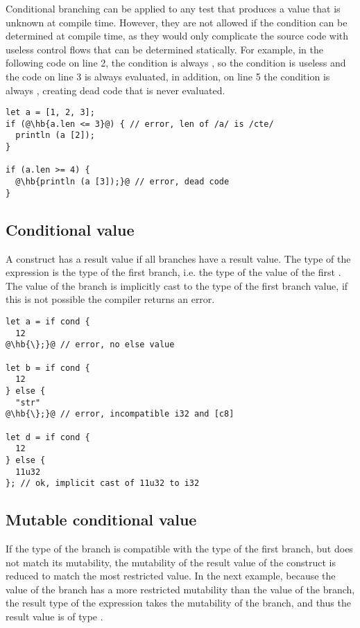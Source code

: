 

Conditional branching can be applied to any test that produces a 
value that is unknown at compile time. However, they are not allowed if the
condition can be determined at compile time, as they would only complicate the
source code with useless control flows that can be determined statically. For
example, in the following code on line 2, the condition is always ,
so the condition is useless and the code on line 3 is always evaluated, in
addition, on line 5 the condition is always , creating dead code
that is never evaluated.

\begin{lstlisting}[style=coloredverbatim, escapechar=@]
let a = [1, 2, 3];
if (@\hb{a.len <= 3}@) { // error, len of /a/ is /cte/
  println (a [2]);
}

if (a.len >= 4) {
  @\hb{println (a [3]);}@ // error, dead code
}
\end{lstlisting}

\subsection {Conditional value}
\label{sec:cond_value_type}

A  construct has a result value if all branches have a result value.
The type of the expression is the type of the first branch, i.e. the type of the
value of the first . The value of the  branch is
implicitly cast to the type of the first branch value, if this is not possible
the compiler returns an error.

\begin{lstlisting}[style=coloredverbatim, escapechar=@]
let a = if cond {
  12
@\hb{\};}@ // error, no else value

let b = if cond {
  12
} else {
  "str"
@\hb{\};}@ // error, incompatible i32 and [c8]

let d = if cond {
  12
} else {
  11u32
}; // ok, implicit cast of 11u32 to i32
\end{lstlisting}

\subsection{Mutable conditional value}

If the type of the  branch is compatible with the type of the first
branch, but does not match its mutability, the mutability of the result value of
the  construct is reduced to match the most restricted value. In the
next example, because the value of the  branch has a more
restricted mutability than the value of the  branch, the result type
of the expression takes the mutability of the  branch, and thus the
result value is of type .

